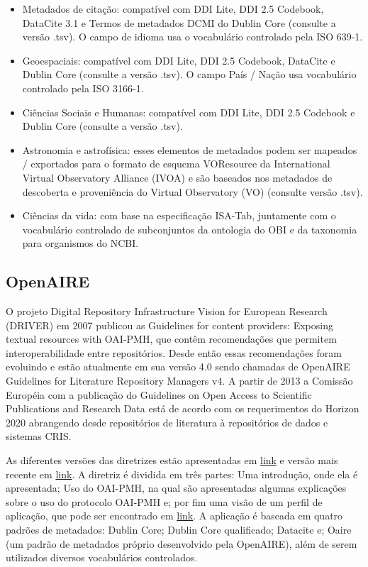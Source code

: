\documentclass[12pt,hidelinks]{article}
\begin{document}
    \begin{itemize}
\item Metadados de citação: compatível com DDI Lite, DDI 2.5 Codebook, DataCite 3.1 e Termos de metadados DCMI do Dublin Core (consulte a versão .tsv). O campo de idioma usa o vocabulário controlado pela ISO 639-1.
\item Geoespaciais: compatível com DDI Lite, DDI 2.5 Codebook, DataCite e Dublin Core (consulte a versão .tsv). O campo País / Nação usa vocabulário controlado pela ISO 3166-1.
\item Ciências Sociais e Humanas: compatível com DDI Lite, DDI 2.5 Codebook e Dublin Core (consulte a versão .tsv).
\item Astronomia e astrofísica: esses elementos de metadados podem ser mapeados / exportados para o formato de esquema VOResource da International Virtual Observatory Alliance (IVOA) e são baseados nos metadados de descoberta e proveniência do Virtual Observatory (VO) (consulte versão .tsv).
\item Ciências da vida: com base na especificação ISA-Tab, juntamente com o \\vocabulário controlado de subconjuntos da ontologia do OBI e da taxonomia para organismos do NCBI.
    \end{itemize}
    
     \subsection{OpenAIRE}
     
\qquad O projeto Digital Repository Infrastructure Vision for European Research  (DRIVER) em 2007 publicou as Guidelines for content providers: Exposing textual resources with OAI-PMH, que contêm recomendações que permitem interoperabilidade entre repositórios. Desde então essas recomendações foram evoluindo e estão atualmente em sua versão 4.0 sendo chamadas de OpenAIRE Guidelines for Literature Repository Managers v4. A partir de 2013 a Comissão Européia com a publicação do Guidelines on Open Access to Scientific Publications and Research Data está de acordo com os requerimentos do Horizon 2020 abrangendo desde repositórios de literatura à repositórios de dados e sistemas CRIS.
	
	As diferentes versões das diretrizes estão apresentadas em \hyperlink{https://guidelines.openaire.eu/en/latest/}{ link} e versão mais recente em \hyperlink{https://openaire-guidelines-for-literature-repository-managers.readthedocs.io/en/v4.0.0/index.html}{ link}. A diretriz é dividida em três partes: Uma introdução, onde ela é apresentada; Uso do OAI-PMH, na qual são apresentadas algumas explicações sobre o uso do protocolo OAI-PMH e; por fim uma visão de um perfil de aplicação, que pode ser encontrado em  \hyperlink{https://openaire-guidelines-for-literature-repository-managers.readthedocs.io/en/v4.0.0/application\_profile.html}{ link}. A aplicação é baseada em quatro padrões de metadados: Dublin Core; Dublin Core qualificado; Datacite e; Oaire (um padrão de metadados próprio desenvolvido pela OpenAIRE), além de serem utilizados diversos vocabulários controlados.\\
	
\end{document}
